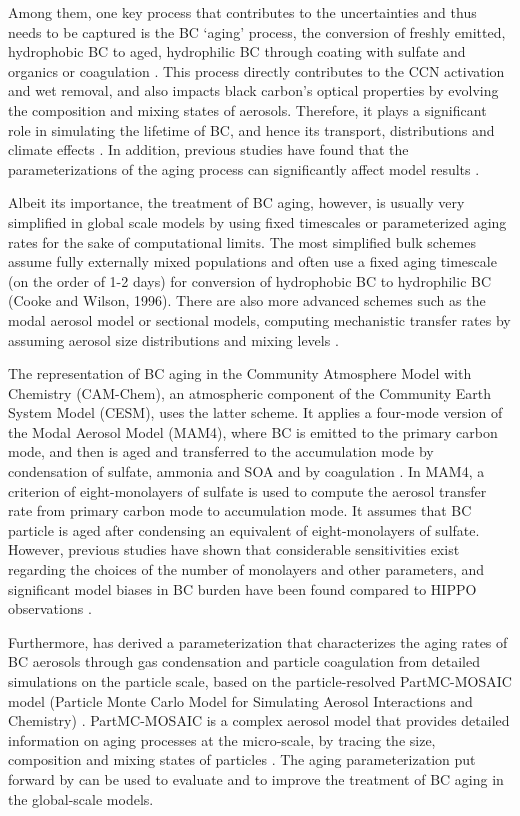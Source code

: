 \documentclass[12pt, fullpage]{uiucthesis2009_2}
\begin{document}
	Among them, one key process that contributes to the uncertainties and thus needs to be captured is the BC ‘aging’ process, the conversion of freshly emitted, hydrophobic BC to aged, hydrophilic BC through coating with sulfate and organics or coagulation \citep[][]{langner1992periodicity,parungo1994aeolian,liousse1996global}. This process directly contributes to the CCN activation and wet removal, and also impacts black carbon's optical properties by evolving the composition and mixing states of aerosols. Therefore, it plays a significant role in simulating the lifetime of BC, and hence its transport, distributions and climate effects \citep[e.g.][]{croft2005black,riemer2004soot}. In addition, previous studies have found that the parameterizations of the aging process can significantly affect model results \citep{Liu2010}.
	
	Albeit its importance, the treatment of BC aging, however, is usually very simplified in global scale models by using fixed timescales or parameterized aging rates for the sake of computational limits. The most simplified bulk schemes assume fully externally mixed populations and often use a fixed aging timescale (on the order of 1-2 days) for conversion of hydrophobic BC to hydrophilic BC (Cooke and Wilson, 1996). There are also more advanced schemes such as the modal aerosol model or sectional models, computing mechanistic transfer rates by assuming aerosol size distributions and mixing levels \citep[e.g.][]{bauer2013historical,huang2013enrichment}. 
	
	The representation of BC aging in the Community Atmosphere Model with Chemistry (CAM-Chem), an atmospheric component of the Community Earth System Model (CESM), uses the latter scheme. It applies a four-mode version of the Modal Aerosol Model (MAM4), where BC is emitted to the primary carbon mode, and then is aged and transferred to the accumulation mode by condensation of sulfate, ammonia and SOA and by coagulation \citep[e.g.][]{Liu2012,Lamarque2012}. In MAM4, a criterion of eight-monolayers of sulfate is used to compute the aerosol transfer rate from primary carbon mode to accumulation mode. It assumes that BC particle is aged after condensing an equivalent of eight-monolayers of sulfate. However, previous studies have shown that considerable sensitivities exist regarding the choices of the number of monolayers and other parameters, and significant model biases in BC burden have been found compared to HIPPO observations \citep{Liu2010}. 
	
	Furthermore, \citet{Fierce2016} has derived a parameterization that characterizes the aging rates of BC aerosols through gas condensation and particle coagulation from detailed simulations on the particle scale, based on the particle-resolved PartMC-MOSAIC model (Particle Monte Carlo Model for Simulating Aerosol Interactions and Chemistry) \citep{Fierce2016}. PartMC-MOSAIC is a complex aerosol model that provides detailed information on aging processes at the micro-scale, by tracing the size, composition and mixing states of particles \citep{riemer2010introducing}. The aging parameterization put forward by \citet{Fierce2016} can be used to evaluate and to improve the treatment of BC aging in the global-scale models. 
	
\end{document}
